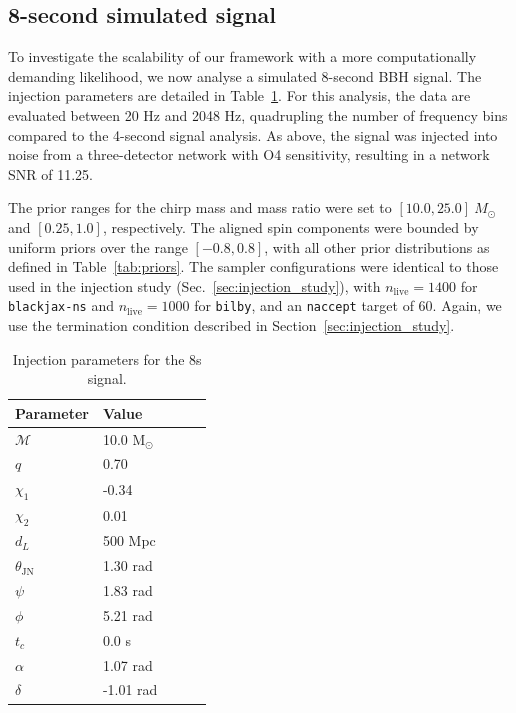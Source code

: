 \documentclass[fleqn,usenatbib]{mnras}
\begin{document}
\subsection{8-second simulated signal}
\label{sec:8s_simulated_signal}

To investigate the scalability of our framework with a more
computationally demanding likelihood, we now analyse a simulated
8-second BBH signal. The injection parameters are detailed in
Table~\ref{tab:8s_injection_params}. For this analysis, the data are
evaluated between 20 Hz and 2048 Hz, quadrupling the number of
frequency bins compared to the 4-second signal analysis. As above, the signal was
injected into noise from a three-detector network with O4 sensitivity,
resulting in a network SNR of 11.25.

The prior ranges for the chirp mass and mass ratio were set to
$[10.0, 25.0]~M_{\odot}$ and $[0.25, 1.0]$, respectively. The aligned
spin components were bounded by uniform priors over the range
$[-0.8, 0.8]$, with all other prior distributions as defined in
Table~\ref{tab:priors}. The sampler configurations were identical to
those used in the injection study (Sec.~\ref{sec:injection_study}), with
$n_{\text{live}}=1400$ for \texttt{blackjax-ns} and
$n_{\text{live}}=1000$ for \texttt{bilby}, and an \texttt{naccept}
target of 60. Again, we use the 
termination condition described in Section~\ref{sec:injection_study}.

\begin{table}
    \centering
    \caption{Injection parameters for the 8s signal.}
    \label{tab:8s_injection_params}
    \begin{tabular}{l l l c c}
    \hline
    \hline
    \textbf{Parameter} & \textbf{Value} \\
    \hline
    $\mathcal{M}$ & 10.0 M$_{\odot}$ \\
    $q$ & 0.70 \\
    $\chi_1$ & -0.34 \\
    $\chi_2$ & 0.01 \\
    $d_L$ & 500 Mpc \\
    $\theta_{\textrm{JN}}$ & 1.30 rad \\
    $\psi$ & 1.83 rad \\
    $\phi$ & 5.21 rad \\
    $t_c$ & 0.0 s\\
    $\alpha$ & 1.07 rad \\
    $\delta$ & -1.01 rad \\
    \hline
    \hline
    \end{tabular}
    \end{table}
\end{document}
